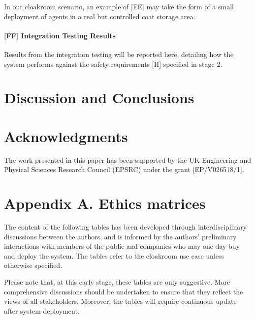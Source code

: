 \documentclass[lettersize,journal]{IEEEtran}
\begin{document}
In our cloakroom scenario, an example of [EE] may take the form of a small deployment of agents in a real but controlled coat storage area.




\paragraph*{[FF] Integration Testing Results}

Results from the integration testing will be reported here, detailing how the system performs against the safety requirements [H] specified in stage 2.

	
\section{Discussion and Conclusions} \label{discussion-conclusions}

\section*{Acknowledgments}
The work presented in this paper has been supported by the UK Engineering and Physical Sciences Research Council (EPSRC) under the grant [EP/V026518/1].

\appendices
\section*{Appendix A. Ethics matrices}
The content of the following tables has been developed through interdisciplinary discussions between the authors, and is informed by the authors’ preliminary interactions with members of the public and companies who may one day buy and deploy the system. The tables refer to the cloakroom use case unless otherwise specified. 

Please note that, at this early stage, these tables are only suggestive. More comprehensive discussions should be undertaken to ensure that they reflect the views of all stakeholders. Moreover, the tables will require continuous update after system deployment. 
\end{document}
